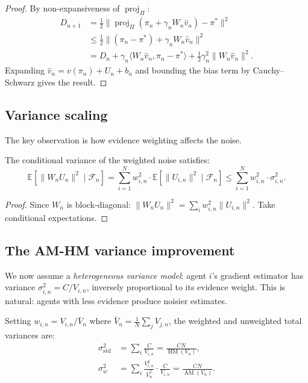 \begin{proof}
By non-expansiveness of $\operatorname{proj}_\Pi$:
\begin{align*}
    D_{n+1} &= \tfrac{1}{2}\|\operatorname{proj}_\Pi(\pi_n + \gamma_n W_n \hat{v}_n) - \pi^*\|^2 \\
    &\leq \tfrac{1}{2}\|(\pi_n - \pi^*) + \gamma_n W_n \hat{v}_n\|^2 \\
    &= D_n + \gamma_n \langle W_n \hat{v}_n, \pi_n - \pi^* \rangle + \tfrac{1}{2}\gamma_n^2 \|W_n \hat{v}_n\|^2.
\end{align*}
Expanding $\hat{v}_n = v(\pi_n) + U_n + b_n$ and bounding the bias term by Cauchy--Schwarz gives the result.
\end{proof}

\subsection{Variance scaling}

The key observation is how evidence weighting affects the noise.

\begin{lemma}
\label{lem:var-scaling-ch7}
The conditional variance of the weighted noise satisfies:
\begin{equation}
    \mathbb{E}[\|W_n U_n\|^2 \mid \mathcal{F}_n] = \sum_{i=1}^N w_{i,n}^2 \cdot \mathbb{E}[\|U_{i,n}\|^2 \mid \mathcal{F}_n] \leq \sum_{i=1}^N w_{i,n}^2 \cdot \sigma_{i,n}^2.
\end{equation}
\end{lemma}

\begin{proof}
Since $W_n$ is block-diagonal: $\|W_n U_n\|^2 = \sum_i w_{i,n}^2 \|U_{i,n}\|^2$. Take conditional expectations.
\end{proof}

\subsection{The AM-HM variance improvement}

We now assume a \emph{heterogeneous variance model}: agent $i$'s gradient estimator has variance $\sigma_{i,n}^2 = C / V_{i,n}$, inversely proportional to its evidence weight. This is natural: agents with less evidence produce noisier estimates.

Setting $w_{i,n} = V_{i,n} / \bar{V}_n$ where $\bar{V}_n = \frac{1}{N}\sum_j V_{j,n}$, the weighted and unweighted total variances are:
\begin{align}
    \sigma_{\text{std}}^2 &= \sum_i \frac{C}{V_{i,n}} = \frac{CN}{\operatorname{HM}(V_n)}, \label{eq:var-std-ch7}\\
    \sigma_w^2 &= \sum_i \frac{V_{i,n}^2}{\bar{V}_n^2} \cdot \frac{C}{V_{i,n}} = \frac{CN}{\operatorname{AM}(V_n)}. \label{eq:var-w-ch7}
\end{align}

